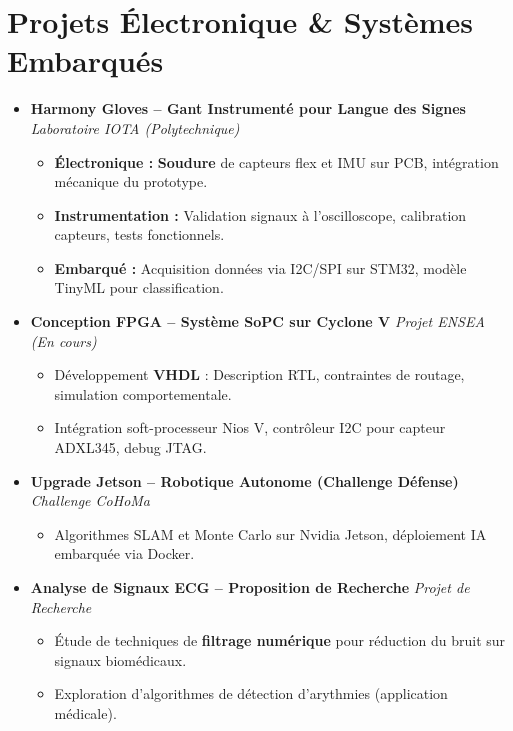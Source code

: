 \documentclass[a4paper,11pt]{article}
\begin{document}
\section{Projets Électronique \& Systèmes Embarqués}
\begin{itemize}[leftmargin=*, label={}]

\item \textbf{Harmony Gloves -- Gant Instrumenté pour Langue des Signes} \hfill \textit{Laboratoire IOTA (Polytechnique)}
    \begin{itemize}[leftmargin=0.4cm, nosep, label=\tiny$\bullet$]
        \item \small{\textbf{Électronique :} \textbf{Soudure} de capteurs flex et IMU sur PCB, intégration mécanique du prototype.}
        \item \small{\textbf{Instrumentation :} Validation signaux à l'oscilloscope, calibration capteurs, tests fonctionnels.}
        \item \small{\textbf{Embarqué :} Acquisition données via I2C/SPI sur STM32, modèle TinyML pour classification.}
    \end{itemize}
    \vspace{2pt}

\item \textbf{Conception FPGA -- Système SoPC sur Cyclone V} \hfill \textit{Projet ENSEA (En cours)}
    \begin{itemize}[leftmargin=0.4cm, nosep, label=\tiny$\bullet$]
        \item \small{Développement \textbf{VHDL} : Description RTL, contraintes de routage, simulation comportementale.}
        \item \small{Intégration soft-processeur Nios V, contrôleur I2C pour capteur ADXL345, debug JTAG.}
    \end{itemize}
    \vspace{2pt}

\item \textbf{Upgrade Jetson -- Robotique Autonome (Challenge Défense)} \hfill \textit{Challenge CoHoMa}
    \begin{itemize}[leftmargin=0.4cm, nosep, label=\tiny$\bullet$]
        \item \small{Algorithmes SLAM et Monte Carlo sur Nvidia Jetson, déploiement IA embarquée via Docker.}
    \end{itemize}
    \vspace{2pt}

\item \textbf{Analyse de Signaux ECG -- Proposition de Recherche} \hfill \textit{Projet de Recherche}
    \begin{itemize}[leftmargin=0.4cm, nosep, label=\tiny$\bullet$]
        \item \small{Étude de techniques de \textbf{filtrage numérique} pour réduction du bruit sur signaux biomédicaux.}
        \item \small{Exploration d'algorithmes de détection d'arythmies (application médicale).}
    \end{itemize}
    \vspace{2pt}


\end{itemize}
\end{document}
